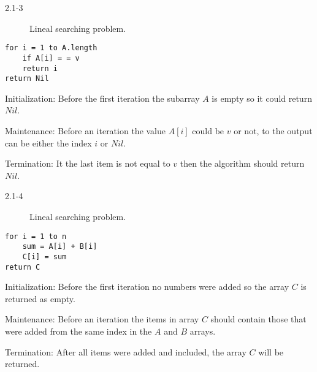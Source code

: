 \begin{description}
 \item[2.1-3] Lineal searching problem.
\end{description}

\begin{lstlisting}
for i = 1 to A.length
    if A[i] = = v
	return i
return Nil
\end{lstlisting}

\begin{list}{}{}
 \item[Initialization:] Before the first iteration the subarray $A$ is empty so it could return $Nil$.
 \item[Maintenance:] Before an iteration the value $A[i]$ could be $v$ or not, to the output can be either the index $i$ or $Nil$.
 \item[Termination:] It the last item is not equal to $v$ then the algorithm should return $Nil$.
\end{list}

\begin{description}
 \item[2.1-4] Lineal searching problem.
\end{description}
\begin{lstlisting}
for i = 1 to n
    sum = A[i] + B[i]
    C[i] = sum
return C
\end{lstlisting}
\begin{list}{}{}
 \item[Initialization:] Before the first iteration no numbers were added so the array $C$ is returned as empty.
 \item[Maintenance:] Before an iteration the items in array $C$ should contain those that were added from the same index in the $A$ and $B$ arrays.
 \item[Termination:] After all items were added and included, the array $C$ will be returned.
\end{list}